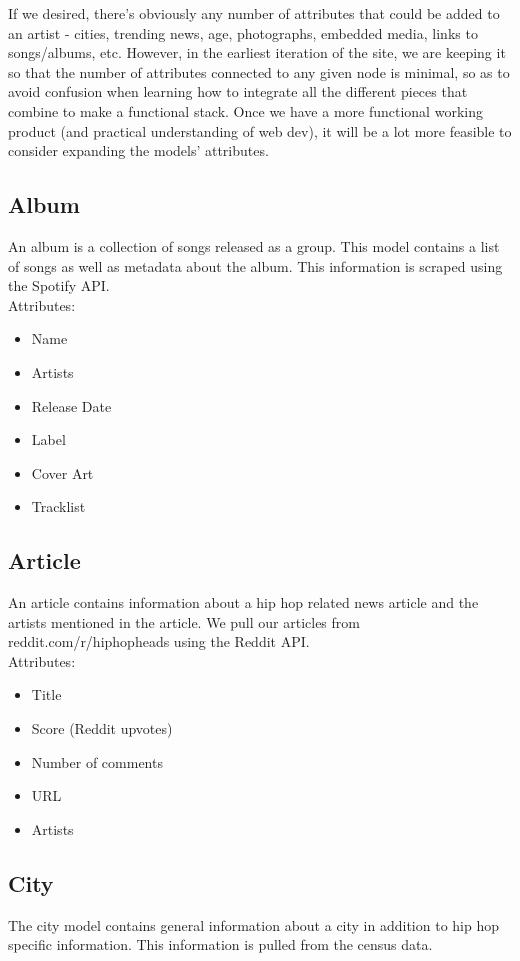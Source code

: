 \documentclass{scrartcl}
\begin{document}
If we desired, there’s obviously any number of attributes that could be added to an artist - cities, trending news, age, photographs, embedded media, links to songs/albums, etc. However, in the earliest iteration of the site, we are keeping it so that the number of attributes connected to any given node is minimal, so as to avoid confusion when learning how to integrate all the different pieces that combine to make a functional stack. Once we have a more functional working product (and practical understanding of web dev), it will be a lot more feasible to consider expanding the models’ attributes. 

\subsection{Album}
An album is a collection of songs released as a group. This model contains a list of songs as well as metadata about the album. This information is scraped using the Spotify API.\\

Attributes:
\begin{itemize}
    \item Name
    \item Artists
    \item Release Date
    \item Label
    \item Cover Art
    \item Tracklist
\end{itemize}

\subsection{Article}
An article contains information about a hip hop related news article and the artists mentioned in the article. We pull our articles from reddit.com/r/hiphopheads using the Reddit API.\\

Attributes:
\begin{itemize}
    \item Title
    \item Score (Reddit upvotes)
    \item Number of comments
    \item URL
    \item Artists
\end{itemize}

\subsection{City}
The city model contains general information about a city in addition to hip hop specific information. This information is pulled from the census data.\\
\end{document}
